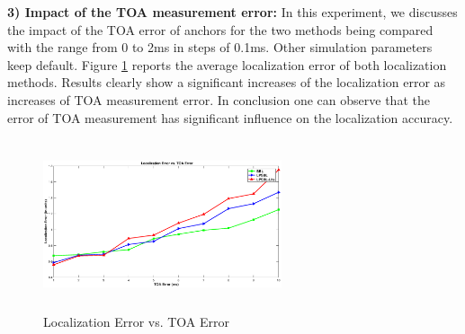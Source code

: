 \textbf{3) Impact of the TOA measurement error:}
In this experiment, we discusses the impact of the TOA error of anchors for the two methods being compared with the range from 0 to 2ms in steps of 0.1ms. 
Other simulation parameters keep default. 
Figure \ref{fig6} reports the average localization error of both localization methods. 
Results clearly show a significant increases of the localization error as increases of TOA measurement error.
In conclusion one can observe that the error of TOA measurement has significant influence on the localization accuracy. 
  \begin{figure}[htb]       
            \centering
			\vspace{-3mm}
            \includegraphics[height=5.0cm,width=7.0cm]{image/TOA.eps}
                \caption{Localization Error vs. TOA Error}
             \vspace{-10mm}
             \label{fig6}
        \end{figure}
		


 



